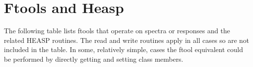 \documentclass[11pt]{book}
\begin{document}
\appendix


\chapter{Ftools and Heasp}

The following table lists ftools that operate on spectra or responses
and the related HEASP routines. The read and write routines apply in
all cases so are not included in the table. In some, relatively
simple, cases the ftool equivalent could be performed by directly
getting and setting class members. 
\end{document}
